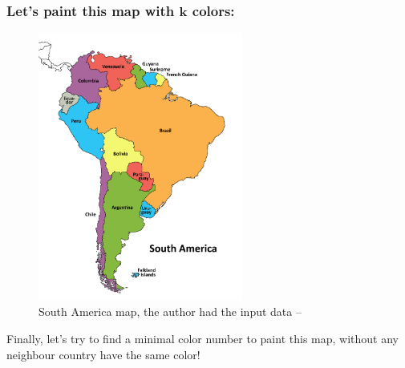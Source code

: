 \documentclass{beamer}
\begin{document}
\begin{frame}[fragile] 

\frametitle{Let's paint this map with \(\textbf{k}\) colors:}
	
\begin{figure}[tbp]
  \centering
    \includegraphics[width=0.6\textwidth , height=0.65\textheight] {south_america.png}
   \caption{South America map, the author had the input data --  \Smiley{}}
	
\end{figure}
	
\pause
Finally, let's try to  find a minimal color number to paint this map, without any neighbour country have the same color!

\end{frame}


\end{document}
